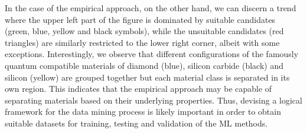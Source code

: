 \documentclass[superscriptaddress,unsortedaddress,
 amsmath,amssymb,
 aps,
]{revtex4-2}
\begin{document}
In the case of the empirical approach, on the other hand, we can discern a trend where the upper left part of the figure is dominated by suitable candidates (green, blue, yellow and black symbols), while the unsuitable candidates (red triangles) are similarly restricted to the lower right corner, albeit with some exceptions. 
Interestingly, we observe that different configurations of the famously quantum compatible materials of diamond (blue), silicon carbide (black) and silicon (yellow) are grouped together but each material class is separated in its own region. 
This indicates that the empirical approach may be capable of separating materials based on their underlying properties. Thus, devising a logical framework for the data mining process is likely important in order to obtain suitable datasets for training, testing and validation of the ML methods. 

\end{document}
